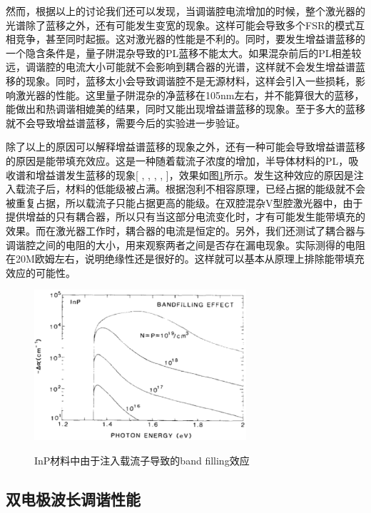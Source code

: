 \documentclass{ZJUthesis}
\begin{document}
然而，根据以上的讨论我们还可以发现，当调谐腔电流增加的时候，整个激光器的光谱除了蓝移之外，还有可能发生变宽的现象。这样可能会导致多个FSR的模式互相竞争，甚至同时起振。这对激光器的性能是不利的。同时，要发生增益谱蓝移的一个隐含条件是，量子阱混杂导致的PL蓝移不能太大。如果混杂前后的PL相差较远，调谐腔的电流大小可能就不会影响到耦合器的光谱，这样就不会发生增益谱蓝移的现象。同时，蓝移太小会导致调谐腔不是无源材料，这样会引入一些损耗，影响激光器的性能。这里量子阱混杂的净蓝移在105nm左右，并不能算很大的蓝移，能做出和热调谐相媲美的结果，同时又能出现增益谱蓝移的现象。至于多大的蓝移就不会导致增益谱蓝移，需要今后的实验进一步验证。

除了以上的原因可以解释增益谱蓝移的现象之外，还有一种可能会导致增益谱蓝移的原因是能带填充效应。这是一种随着载流子浓度的增加，半导体材料的PL，吸收谱和增益谱发生蓝移的现象[ , , , , ]，效果如图\ref{fig_bandfilling}所示。发生这种效应的原因是注入载流子后，材料的低能级被占满。根据泡利不相容原理，已经占据的能级就不会被重复占据，所以载流子只能占据更高的能级。在双腔混杂V型腔激光器中，由于提供增益的只有耦合器，所以只有当这部分电流变化时，才有可能发生能带填充的效果。而在激光器工作时，耦合器的电流是恒定的。另外，我们还测试了耦合器与调谐腔之间的电阻的大小，用来观察两者之间是否存在漏电现象。实际测得的电阻在20M欧姆左右，说明绝缘性还是很好的。这样就可以基本从原理上排除能带填充效应的可能性。

\begin{figure}[!ht]
  \centering
  \includegraphics[width=0.7\textwidth]{./Pictures/bandfilling.eps}\\
  \caption{InP材料中由于注入载流子导致的band filling效应}
  \label{fig_bandfilling}
\end{figure}

\subsection{双电极波长调谐性能}
\end{document}
